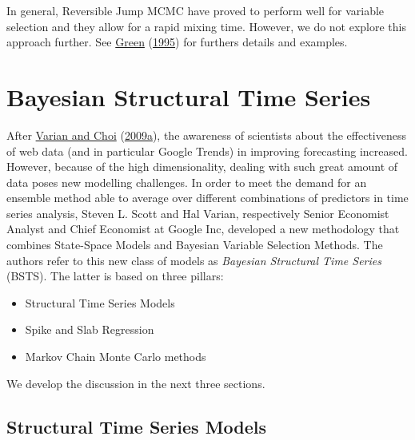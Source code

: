 \documentclass[
  12pt,
]{book}
\theoremstyle{break}
\theoremstyle{nonumberplain}
\begin{document}
In general, Reversible Jump MCMC have proved to perform well for
variable selection and they allow for a rapid mixing time. However, we
do not explore this approach further. See
\protect\hyperlink{ref-G_1995}{Green}
(\protect\hyperlink{ref-G_1995}{1995}) for furthers details and
examples.

\section{Bayesian Structural Time Series} \label{Bayesian Structural Time Series}

After \protect\hyperlink{ref-varian_choi_2009}{Varian and Choi}
(\protect\hyperlink{ref-varian_choi_2009}{2009a}), the awareness of
scientists about the effectiveness of web data (and in particular Google
Trends) in improving forecasting increased. However, because of the high
dimensionality, dealing with such great amount of data poses new
modelling challenges. In order to meet the demand for an ensemble method
able to average over different combinations of predictors in time series
analysis, Steven L. Scott and Hal Varian, respectively Senior Economist
Analyst and Chief Economist at Google Inc, developed a new methodology
that combines State-Space Models and Bayesian Variable Selection
Methods. The authors refer to this new class of models as
\emph{Bayesian Structural Time Series} (BSTS). The latter is based on
three pillars:

\begin{itemize}
\itemsep-0.5em 
  \item Structural Time Series Models
  \item Spike and Slab Regression
  \item Markov Chain Monte Carlo methods
\end{itemize}

We develop the discussion in the next three sections.

\subsection{Structural Time Series Models}\label{Structural Time Series Models}
\end{document}
